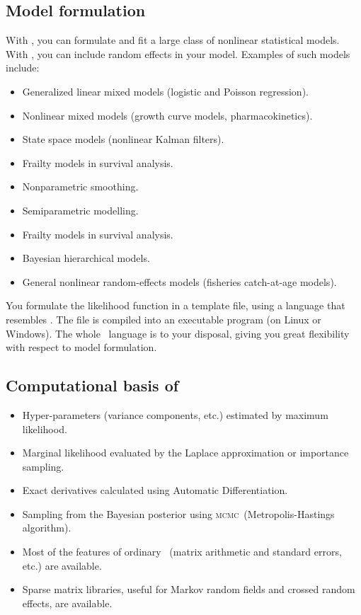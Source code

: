 \documentclass{admbmanual}
\newcommand{\scMCMC}{\textsc{mcmc}}
\begin{document}
\subsection{Model formulation}

With \scAB, you can formulate and fit a large class of nonlinear statistical
models. With \scAR, you can include random effects in your model. Examples of such models include:
\begin{itemize}
\item Generalized linear mixed models (logistic and Poisson regression).
\item Nonlinear mixed models (growth curve models, pharmacokinetics).
\item State space models (nonlinear Kalman filters).
\item Frailty models in survival analysis.
\item Nonparametric smoothing.
\item Semiparametric modelling.
\item Frailty models in survival analysis.
\item Bayesian hierarchical models.
\item General nonlinear random-effects models (fisheries catch-at-age
models).
\end{itemize}
You formulate the likelihood function in a template file, using a language that resembles \cplus. The file is
compiled into an executable program (on Linux or Windows). The whole \cplus\ language is to your disposal, giving you
great flexibility with respect to model formulation.


\subsection{Computational basis of \scAR}

\begin{itemize}
\item Hyper-parameters (variance components, etc.) estimated by maximum likelihood.
\item Marginal likelihood evaluated by the Laplace approximation or importance sampling.
\item Exact derivatives calculated using Automatic Differentiation.
\item Sampling from the Bayesian posterior using \scMCMC\ (Metropolis-Hastings algorithm).
\item Most of the features of ordinary \scAB\ (matrix arithmetic and standard errors, etc.) are available.
\item Sparse matrix libraries, useful for Markov random fields and crossed random effects, are available.
\end{itemize}
\end{document}
